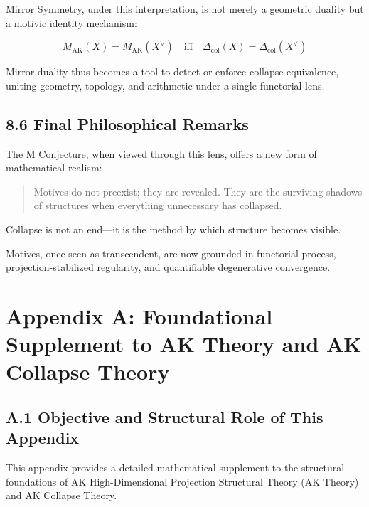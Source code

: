 \documentclass[11pt]{article}
\begin{document}
Mirror Symmetry, under this interpretation, is not merely a geometric duality but a motivic identity mechanism:

\begin{equation}
M_{\mathrm{AK}}(X) = M_{\mathrm{AK}}(X^{\vee}) \quad \text{iff} \quad \Delta_{\mathrm{col}}(X) = \Delta_{\mathrm{col}}(X^{\vee})
\end{equation}

Mirror duality thus becomes a tool to detect or enforce collapse equivalence, uniting geometry, topology, and arithmetic under a single functorial lens.

\subsection{8.6 Final Philosophical Remarks}

The M Conjecture, when viewed through this lens, offers a new form of mathematical realism:

\begin{quote}
Motives do not preexist; they are revealed. They are the surviving shadows of structures when everything unnecessary has collapsed.
\end{quote}

Collapse is not an end—it is the method by which structure becomes visible.

Motives, once seen as transcendent, are now grounded in functorial process, projection-stabilized regularity, and quantifiable degenerative convergence.

\FloatBarrier





\appendix
\section*{Appendix A: Foundational Supplement to AK Theory and AK Collapse Theory}

\subsection*{A.1 Objective and Structural Role of This Appendix}

This appendix provides a detailed mathematical supplement to the structural foundations of AK High-Dimensional Projection Structural Theory (AK Theory) and AK Collapse Theory.
\end{document}
